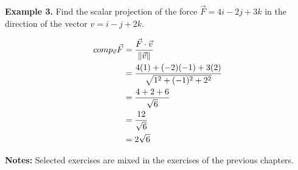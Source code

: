 \newpage
\noindent\textbf{Example 3. } Find the scalar projection of the force $\vec{F} = 4i - 2j + 3k$ in the direction of the vector $v = i - j + 2k$.

\sol{}
\begin{align*}
    comp_{\vec{v}}\vec{F} & = \frac{\vec{F} \cdot \vec{v}}{\left\lVert\vec{v}\right\rVert}             \\
                          & = \frac{4(1) + (-2)(-1) + 3(2)}{\sqrt{1^2 + (-1)^2 + 2^2}} \\
                          & = \frac{4 + 2 + 6}{\sqrt{6}}                               \\
                          & = \frac{12}{\sqrt{6}}                                      \\
                          & = 2\sqrt{6}
\end{align*}

\noindent\textbf{Notes:} Selected exercises are mixed in the exercises of the previous chapters.